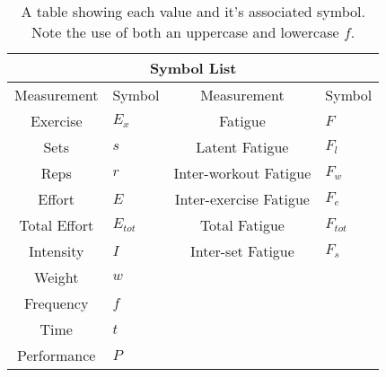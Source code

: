 \begin{table}[h]
	\centering
    \begin{tabular}{|c|l||c|l|}
	    	\hline
	    \multicolumn{4}{|c|}{Symbol List} \\
	    \hline
        Measurement & Symbol & Measurement & Symbol\\
        \hline
        Exercise & $E_x$ & Fatigue & $F$ \\
        Sets & $s$ & Latent Fatigue & $F_l$ \\
        Reps & $r$ & Inter-workout Fatigue & $F_w$ \\
        Effort & $E$ & Inter-exercise Fatigue & $F_e$ \\
        Total Effort & $E_{tot}$ & Total Fatigue & $F_{tot}$ \\ 
        Intensity & $I$ & Inter-set Fatigue & $F_s$ \\ 
        Weight & $w$  & & \\
        Frequency & $f$ & & \\
        Time & $t$ & & \\
        Performance & $P$ & & \\
        \hline
    \end{tabular}
    \caption{A table showing each value and it's associated symbol. Note the use of both an uppercase and lowercase $f$.}
    \label{tab:SymbolTable}
\end{table}
